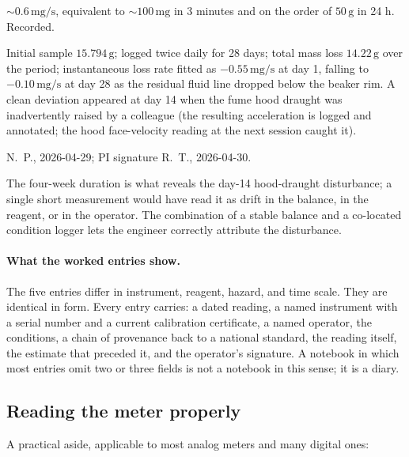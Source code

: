\begin{description}[leftmargin=2em, itemsep=2pt]
    $\sim 0.6 \,\si{\milli\gram\per\second}$, equivalent to
    $\sim 100 \,\si{\milli\gram}$ in 3 minutes and on the order of
    $50 \,\si{\gram}$ in 24 h. Recorded.
  \item[Reading.] Initial sample $15.794 \,\si{\gram}$; logged twice
    daily for 28 days; total mass loss
    $14.22 \,\si{\gram}$ over the period; instantaneous loss rate
    fitted as $-0.55 \,\si{\milli\gram\per\second}$ at day 1,
    falling to $-0.10 \,\si{\milli\gram\per\second}$ at day 28 as
    the residual fluid line dropped below the beaker rim. A clean
    deviation appeared at day 14 when the fume hood draught was
    inadvertently raised by a colleague (the resulting acceleration
    is logged and annotated; the hood face-velocity reading at the
    next session caught it).
  \item[Signature.] N.~P., 2026-04-29; PI signature R.~T.,
    2026-04-30.
\end{description}

The four-week duration is what reveals the day-14 hood-draught
disturbance; a single short measurement would have read it as drift
in the balance, in the reagent, or in the operator. The combination
of a stable balance and a co-located condition logger lets the
engineer correctly attribute the disturbance.

\paragraph{What the worked entries show.}

The five entries differ in instrument, reagent, hazard, and time
scale. They are identical in form. Every entry carries: a dated
reading, a named instrument with a serial number and a current
calibration certificate, a named operator, the conditions, a chain
of provenance back to a national standard, the reading itself, the
estimate that preceded it, and the operator's signature. A
notebook in which most entries omit two or three fields is not a
notebook in this sense; it is a diary.

\subsection{Reading the meter properly}

A practical aside, applicable to most analog meters and many
digital ones:

